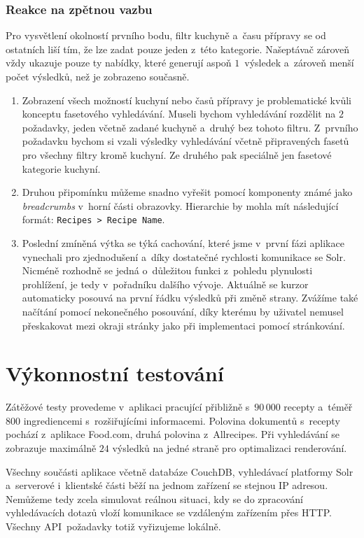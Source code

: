 \subsubsection{Reakce na zpětnou vazbu}

Pro vysvětlení okolností prvního bodu, filtr kuchyně a~času přípravy se od ostatních liší tím, že lze zadat pouze jeden z~této kategorie. Našeptávač zároveň vždy ukazuje pouze ty nabídky, které generují aspoň $1$~výsledek a~zároveň menší počet výsledků, než je zobrazeno současně. 

\begin{enumerate}
    \item Zobrazení všech možností kuchyní nebo časů přípravy je problematické kvůli konceptu fasetového vyhledávání. Museli bychom vyhledávání rozdělit na $2$ požadavky, jeden včetně zadané kuchyně a~druhý bez tohoto filtru. Z~prvního požadavku bychom si vzali výsledky vyhledávání včetně připravených fasetů pro všechny filtry kromě kuchyní. Ze druhého pak speciálně jen fasetové kategorie kuchyní.
    \item Druhou připomínku můžeme snadno vyřešit pomocí komponenty známé jako \emph{breadcrumbs} v~horní části obrazovky. Hierarchie by mohla mít následující formát: \texttt{Recipes\,>\,Recipe\,Name}.
    \item Poslední zmíněná výtka se týká cachování, které jsme v~první fázi aplikace vynechali pro zjednodušení a~díky dostatečné rychlosti komunikace se Solr. Nicméně rozhodně se jedná o~důležitou funkci z~pohledu plynulosti prohlížení, je tedy v~pořadníku dalšího vývoje. Aktuálně se kurzor automaticky posouvá na první řádku výsledků při změně strany. Zvážíme také načítání pomocí nekonečného posouvání, díky kterému by uživatel nemusel přeskakovat mezi okraji stránky jako při implementaci pomocí stránkování.
\end{enumerate}

\section{Výkonnostní testování}

Zátěžové testy provedeme v~aplikaci pracující přibližně s~$90\,000$ recepty a~té\-měř $800$ ingrediencemi s~rozšiřujícími informacemi. Polovina dokumentů s~recepty pochází z~aplikace Food.com, druhá polovina z~Allrecipes. Při vyhledávání se zobrazuje maximálně $24$ výsledků na jedné straně pro optimalizaci renderování.

Všechny součásti aplikace včetně databáze CouchDB, vyhledávací platformy Solr a~serverové i~klientské části běží na jednom zařízení se stejnou IP adresou. Nemůžeme tedy zcela simulovat reálnou situaci, kdy se do zpracování vyhledávacích dotazů vloží komunikace se vzdáleným zařízením přes HTTP. Všechny API~požadavky totiž vyřizujeme lokálně.

